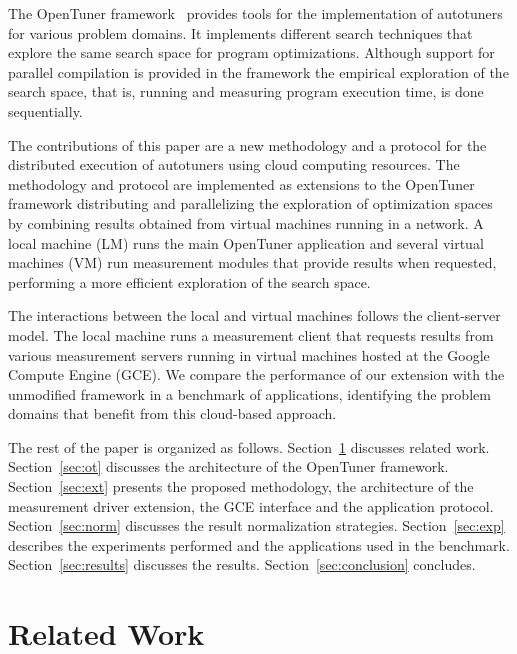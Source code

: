 \documentclass[12pt]{article}
\begin{document}
The OpenTuner framework~\cite{ansel2014opentuner} provides tools for the
implementation of autotuners for various problem domains. It implements
different search techniques that explore the same search space for program
optimizations. Although support for parallel compilation is provided in the
framework the empirical exploration of the search space, that is, running and
measuring program execution time, is done sequentially.

The contributions of this paper are a new methodology and a protocol for the
distributed execution of autotuners using cloud computing resources.  The
methodology and protocol are implemented as extensions to the OpenTuner
framework distributing and parallelizing the exploration of optimization spaces
by combining results obtained from virtual machines running in a network.  A
local machine (LM) runs the main OpenTuner application and several virtual
machines (VM) run measurement modules that provide results when requested,
performing a more efficient exploration of the search space.

The interactions between the local and virtual machines follows the
client-server model. The local machine runs a measurement client that requests
results from various measurement servers running in virtual machines hosted at
the Google Compute Engine (GCE).  We compare the performance of our extension
with the unmodified framework in a benchmark of applications,
identifying the problem domains that benefit from this cloud-based approach.

The rest of the paper is organized as follows.
Section~\ref{sec:related} discusses related work.
Section~\ref{sec:ot} discusses the architecture of the OpenTuner framework.
Section~\ref{sec:ext} presents the proposed methodology, the architecture of 
the measurement driver extension, the GCE interface and the application 
protocol.
Section~\ref{sec:norm} discusses the result normalization strategies.
Section~\ref{sec:exp} describes the experiments performed and the
applications used in the benchmark.
Section~\ref{sec:results} discusses the results.
Section~\ref{sec:conclusion} concludes.

\section{Related Work} \label{sec:related}
\end{document}
